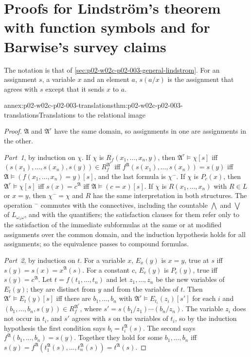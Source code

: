 \section{Proofs for Lindstr\"om's theorem with function symbols and for Barwise's survey claims}
\label{sec:annex-p02-w02c-p02-003}

The notation is that of \cref{sec:p02-w02c-p02-003-general-lindstrom}.
For an assignment \(s\), a variable \(x\) and an element \(a\),
\(s(a/x)\) is the assignment that agrees with \(s\) except that it sends
\(x\) to \(a\).

\begin{annexitem}{annex:p02-w02c-p02-003-translations}{thm:p02-w02c-p02-003-translations}{Translations to the relational image}
\begin{proof}
\(\mathfrak A\) and \(\mathfrak A^{r}\) have the same domain, so
assignments in one are assignments in the other.

\emph{Part~1}, by induction on \(\chi\).  If \(\chi\) is
\(R_f(x_1,\ldots,x_n,y)\), then \(\mathfrak A^{r}\models\chi[s]\) iff
\((s(x_1),\ldots,s(x_n),s(y))\in R_f^{\mathfrak A^{r}}\) iff
\(f^{\mathfrak A}(s(x_1),\ldots,s(x_n))=s(y)\) iff
\(\mathfrak A\models(f(x_1,\ldots,x_n)=y)[s]\), and the last formula is
\(\chi^{-}\).  If \(\chi\) is \(P_c(x)\), then
\(\mathfrak A^{r}\models\chi[s]\) iff \(s(x)=c^{\mathfrak A}\) iff
\(\mathfrak A\models(c=x)[s]\).  If \(\chi\) is \(R(x_1,\ldots,x_n)\) with
\(R\in L\) or \(x=y\), then \(\chi^{-}=\chi\) and \(R\) has the same
interpretation in both structures.  The operation \({}^{-}\) commutes with
the connectives, including the countable \(\bigwedge\) and \(\bigvee\) of
\(L_{\omega_1\omega}\), and with the quantifiers; the satisfaction clauses for them refer
only to the satisfaction of the immediate subformulas at the same or at
modified assignments over the common domain, and the induction hypothesis
holds for all assignments; so the equivalence passes to compound formulas.

\emph{Part~2}, by induction on \(t\).  For a variable \(x\),
\(E_x(y)\) is \(x=y\), true at \(s\) iff \(s(y)=s(x)=x^{\mathfrak A}(s)\).
For a constant \(c\), \(E_c(y)\) is \(P_c(y)\), true iff
\(s(y)=c^{\mathfrak A}\).  Let \(t=f(t_1,\ldots,t_n)\) and let
\(z_1,\ldots,z_n\) be the new variables of \(E_t(y)\); they are distinct
from \(y\) and from the variables of \(t\).  Then
\(\mathfrak A^{r}\models E_t(y)[s]\) iff there are \(b_1,\ldots,b_n\) with
\(\mathfrak A^{r}\models E_{t_i}(z_i)[s']\) for each \(i\) and
\((b_1,\ldots,b_n,s(y))\in R_f^{\mathfrak A^{r}}\), where
\(s'=s(b_1/z_1)\cdots(b_n/z_n)\).  The variable \(z_i\) does not occur in
\(t_i\), and \(s'\) agrees with \(s\) on the variables of \(t_i\), so by
the induction hypothesis the first condition says \(b_i=t_i^{\mathfrak A}(s)\).
The second says \(f^{\mathfrak A}(b_1,\ldots,b_n)=s(y)\).  Together they hold
for some \(b_1,\ldots,b_n\) iff
\(s(y)=f^{\mathfrak A}(t_1^{\mathfrak A}(s),\ldots,t_n^{\mathfrak A}(s))=t^{\mathfrak A}(s)\).


\end{proof}
\end{annexitem}

